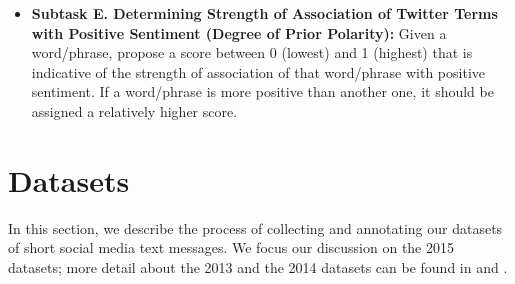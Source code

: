 \documentclass[11pt]{article}
\begin{document}
\begin{itemize}[leftmargin=*]


\item \textbf{Subtask E. Determining Strength of Association of Twitter Terms with Positive Sentiment (Degree of Prior Polarity):} Given a word/phrase, propose a score between 0 (lowest) and 1 (highest) that is indicative of the strength of association of that word/phrase with positive sentiment. If a word/phrase is more positive than another one, it should be assigned a relatively higher score.

\end{itemize}


\section{Datasets}

In this section, we describe the process of collecting and annotating our datasets
of short social media text messages.
We focus our discussion on the 2015 datasets;
more detail about the 2013 and the 2014 datasets can be found in \cite{Semeval2013} and \cite{rosenthal-EtAl:2014:SemEval}.
\end{document}
